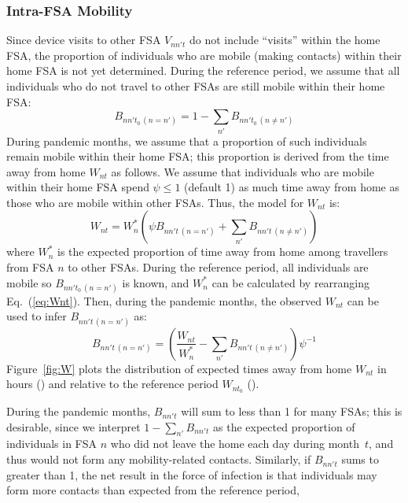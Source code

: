 \subsubsection{Intra-FSA Mobility}\label{app.mob.intra}
Since device visits to other FSA $V_{nn't}$ do not include ``visits'' within the home FSA,
the proportion of individuals who are mobile (making contacts) within their home FSA is not yet determined.
During the reference period, we assume that
all individuals who do not travel to other FSAs are still mobile within their home FSA:
\begin{equation}\label{eq:Bnnt.intra.t0}
  B_{nn't_0\,(n = n')} = 1 - \sum_{n'} B_{nn't_0\,(n \ne n')}
\end{equation}
During pandemic months, we assume that
a proportion of such individuals remain mobile within their home FSA;
this proportion is derived from the time away from home $W_{nt}$ as follows.
We assume that individuals who are mobile within their home FSA
spend $\psi \le 1$ (default 1) as much time away from home as
those who are mobile within other FSAs.
Thus, the model for $W_{nt}$ is:
\begin{equation}\label{eq:Wnt}
  W_{nt} = W^*_n \left(\psi B_{nn't\,(n = n')} + \sum_{n'} B_{nn't\,(n \ne n')} \right)
\end{equation}
where $W^*_n$ is the expected proportion of time away from home
among travellers from FSA $n$ to other FSAs.
During the reference period, all individuals are mobile so $B_{nn't_0\,(n = n')}$ is known, and
$W^*_n$ can be calculated by rearranging Eq.~(\ref{eq:Wnt}).
Then, during the pandemic months, the observed $W_{nt}$ can be used to infer $B_{nn't\,(n = n')}$ as:
\begin{equation}\label{eq:Bnnt.intra.t}
  B_{nn't\,(n = n')} = \left(\frac{W_{nt}}{W^*_n} - \sum_{n'} B_{nn't\,(n \ne n')}\right) \psi^{-1}
\end{equation}
Figure~\ref{fig:W} plots the distribution of expected times away from home $W_{nt}$
in hours () and relative to the reference period $W_{nt_0}$ ().
\par
During the pandemic months, $B_{nn't}$ will sum to less than 1 for many FSAs;
this is desirable, since we interpret $1 - \sum_{n'} B_{nn't}$ as
the expected proportion of individuals in FSA $n$
who did not leave the home each day during month~$t$,
and thus would not form any mobility-related contacts.
Similarly, if $B_{nn't}$ sums to greater than 1, the net result in the force of infection is that
individuals may form more contacts than expected from the reference period,
